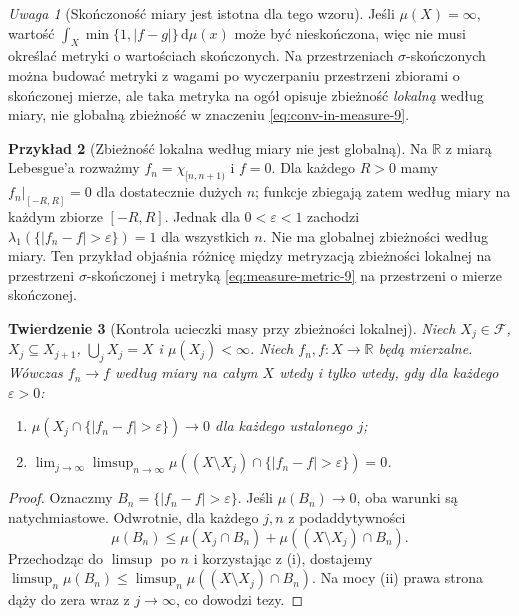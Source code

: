 \documentclass[11pt,a4paper,oneside]{book}
\numberwithin{equation}{chapter}
\theoremstyle{plain}
\newtheorem{twierdzenie}{Twierdzenie}[chapter]
\theoremstyle{definition}
\newtheorem{przyklad}[twierdzenie]{Przykład}
\theoremstyle{remark}
\newtheorem{uwaga}[twierdzenie]{Uwaga}
\begin{document}
\begin{uwaga}[Skończoność miary jest istotna dla tego wzoru]
Jeśli $\mu(X)=\infty$, wartość
$\int_X\min\{1,|f-g|\}\,\mathrm d\mu(x)$
może być nieskończona, więc nie musi określać
metryki o wartościach skończonych.
Na przestrzeniach $\sigma$-skończonych można budować
metryki z wagami po wyczerpaniu przestrzeni zbiorami
o skończonej mierze, ale taka metryka na ogół
opisuje zbieżność \emph{lokalną} według miary,
nie globalną zbieżność w znaczeniu
\eqref{eq:conv-in-measure-9}.
\end{uwaga}


\begin{przyklad}[Zbieżność lokalna według miary nie jest globalną]
\label{ex:local-vs-global-9}
Na $\mathbb R$ z miarą Lebesgue'a rozważmy
$f_n=\chi_{[n,n+1)}$ i $f=0$. Dla każdego
$R>0$ mamy $f_n|_{[-R,R]}=0$ dla dostatecznie
dużych $n$; funkcje zbiegają zatem według miary na
każdym zbiorze $[-R,R]$. Jednak dla $0<\varepsilon<1$
zachodzi $\lambda_1(\{|f_n-f|>\varepsilon\})=1$
dla wszystkich $n$. Nie ma globalnej zbieżności
według miary. Ten przykład objaśnia różnicę między
metryzacją zbieżności lokalnej na przestrzeni
$\sigma$-skończonej i metryką \eqref{eq:measure-metric-9}
na przestrzeni o mierze skończonej.
\end{przyklad}

\begin{twierdzenie}[Kontrola ucieczki masy przy zbieżności lokalnej]
\label{thm:local-to-global-measure-9}
Niech $X_j\in\mathcal F$, $X_j\subseteq X_{j+1}$,
$\bigcup_jX_j=X$ i $\mu(X_j)<\infty$.
Niech $f_n,f:X\to\mathbb R$ będą mierzalne.
Wówczas $f_n\to f$ według miary na całym $X$
wtedy i tylko wtedy, gdy dla każdego $\varepsilon>0$:
\begin{enumerate}[label=\textup{(\roman*)}]
\item $\mu(X_j\cap\{|f_n-f|>\varepsilon\})\to0$
dla każdego ustalonego $j$;
\item $\displaystyle \lim_{j\to\infty}\limsup_{n\to\infty}
\mu((X\setminus X_j)\cap\{|f_n-f|>\varepsilon\})=0$.
\end{enumerate}
\end{twierdzenie}
\begin{proof}
Oznaczmy $B_n=\{|f_n-f|>\varepsilon\}$.
Jeśli $\mu(B_n)\to0$, oba warunki są natychmiastowe.
Odwrotnie, dla każdego $j,n$ z podaddytywności
\[
\mu(B_n)\le\mu(X_j\cap B_n)+
\mu((X\setminus X_j)\cap B_n).
\]
Przechodząc do $\limsup$ po $n$ i korzystając
z (i), dostajemy
$\limsup_n\mu(B_n)\le
\limsup_n\mu((X\setminus X_j)\cap B_n)$.
Na mocy (ii) prawa strona dąży do zera wraz
z $j\to\infty$, co dowodzi tezy.
\end{proof}
\end{document}
